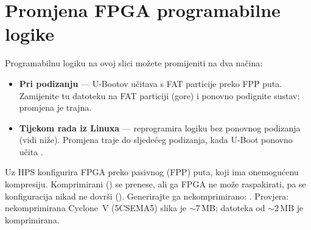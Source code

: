 \section{Promjena FPGA programabilne logike}
Programabilnu logiku na ovoj slici možete promijeniti na dva načina:
\begin{itemize}
  \item \textbf{Pri podizanju} --- U-Bootov  učitava
         s FAT particije preko FPP puta. Zamijenite tu
        datoteku na FAT particiji (gore) i ponovno podignite sustav; promjena je trajna.
  \item \textbf{Tijekom rada iz Linuxa} ---  reprogramira
        logiku bez ponovnog podizanja (vidi niže). Promjena traje do sljedećeg
        podizanja, kada U-Boot ponovno učita .
\end{itemize}

\begin{warn}
Uz  HPS konfigurira FPGA preko pasivnog (FPP) puta, koji ima
onemogućenu kompresiju. Komprimirani 
() se prenese, ali ga FPGA ne može raspakirati,
pa se konfiguracija nikad ne dovrši (). Generirajte ga nekomprimirano:
.
Provjera: nekomprimirana Cyclone~V (5CSEMA5) slika je $\sim$7\,MB; datoteka od
$\sim$2\,MB je komprimirana.
\end{warn}

